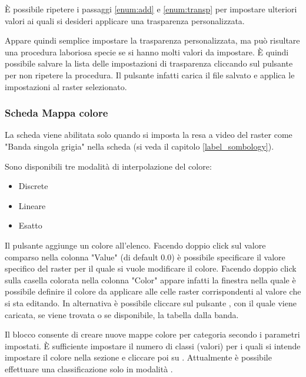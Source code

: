 È possibile ripetere i passaggi \ref{enum:add} e \ref{enum:transp} per
impostare ulteriori valori ai quali si desideri applicare una trasparenza
personalizzata.

Appare quindi semplice impostare la trasparenza personalizzata, ma può
risultare una procedura laboriosa specie se si hanno molti valori da
impostare. È quindi possibile salvare la lista delle impostazioni di
trasparenza cliccando sul pulsante  per non ripetere la procedura. Il pulsante
 infatti carica il file
salvato e applica le impostazioni al raster selezionato.

\subsubsection{Scheda Mappa colore} \label{label_colormaptab}

La scheda  viene abilitata solo quando si imposta la resa
a video del raster come "Banda singola grigia" nella scheda
 (si veda il capitolo \ref{label_sombology}).

Sono disponibili tre modalità di interpolazione del colore:
\begin{itemize}
\item Discrete
\item Lineare
\item Esatto
\end{itemize}

Il pulsante  aggiunge un colore all'elenco.
Facendo doppio click sul valore comparso nella colonna "Value" (di default
0.0) è possibile specificare il valore specifico del raster per il quale si
vuole modificare il colore.
Facendo doppio click sulla casella colorata nella colonna "Color" appare
infatti la finestra  nella quale è possibile definire il
colore da applicare alle celle raster corrispondenti al valore che si sta editando.
In alternativa è possibile cliccare sul pulsante
, con il
quale viene caricata, se viene trovata o se disponibile, la tabella dalla banda.

Il blocco  consente di creare nuove
mappe colore per categoria secondo i parametri impostati. È sufficiente
impostare il numero di classi (valori) per i quali si intende impostare il
colore nella sezione  e cliccare poi su
. Attualmente è possibile effettuare una classificazione
solo in modalità .

